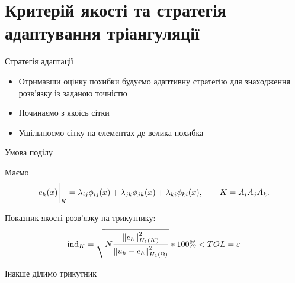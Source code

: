 
\section{Критерій якості та стратегія адаптування тріангуляції}
\frame{\sectionpage}

\begin{frame}{Стратегія адаптації}

	\begin{itemize}
		\item Отримавши оцінку похибки будуємо адаптивну стратегію для знаходження розв'язку із заданою точністю
		\item Починаємо з якоїсь сітки
		\item Ущільнюємо сітку на елементах де велика похибка
	\end{itemize}

\end{frame}

\begin{frame}{Умова поділу}

	Маємо
	\begin{equation}\label{eq:error_element}
		e_h(x)\bigg|_K = \lambda_{ij} \phi_{ij}(x)+\lambda_{jk} \phi_{jk}(x)+\lambda_{ki} \phi_{ki}(x), \qquad K = A_iA_jA_k.
	\end{equation}

	Показник якості розв'язку на трикутнику:
	\begin{equation}\label{eq:error_indicator}
		\text{ind}_K = \sqrt{N \frac
				{\norm{e_h}^2_{H_1(K)}}
				{\norm{u_h+e_h}^2_{H_1(\Omega)}}
		}*100\% < TOL = \varepsilon %
	\end{equation}

	Інакше ділимо трикутник 

\end{frame}

\undeff{\error}
